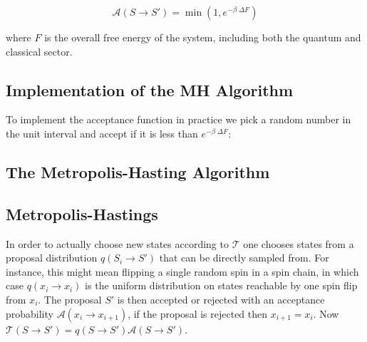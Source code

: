 \[\mathcal{A}(S \to S') = \min\left(1, e^{-\beta\;\Delta F}\right)\]

where \(F\) is the overall free energy of the system, including both the quantum and classical sector.

\hypertarget{implementation-of-the-mh-algorithm}{%
\subsection{Implementation of the MH Algorithm}\label{implementation-of-the-mh-algorithm}}

To implement the acceptance function in practice we pick a random number in the unit interval and accept if it is less than \(e^{-\beta\;\Delta F}\):

\begin{Shaded}
\begin{Highlighting}[]
\OperatorTok{=}

 
\OperatorTok{=}
\OperatorTok{=}

    \NormalTok{,}\NormalTok{) }\OperatorTok{\textless{}}\OperatorTok{{-}}\OperatorTok{*}
\OperatorTok{=}
        
\OperatorTok{=}
\end{Highlighting}
\end{Shaded}

\hypertarget{the-metropolis-hasting-algorithm}{%
\subsection{The Metropolis-Hasting Algorithm}\label{the-metropolis-hasting-algorithm}}

\hypertarget{metropolis-hastings}{%
\subsection{Metropolis-Hastings}\label{metropolis-hastings}}

In order to actually choose new states according to \(\mathcal{T}\) one chooses states from a proposal distribution \(q(S_i \to S')\) that can be directly sampled from. For instance, this might mean flipping a single random spin in a spin chain, in which case \(q(x_i\to x_i)\) is the uniform distribution on states reachable by one spin flip from \(x_i\). The proposal \(S'\) is then accepted or rejected with an acceptance probability \(\mathcal{A}(x_i\to x_{i+1})\), if the proposal is rejected then \(x_{i+1} = x_{i}\). Now \(\mathcal{T}(S\to S') = q(S\to S')\mathcal{A}(S \to S')\).

